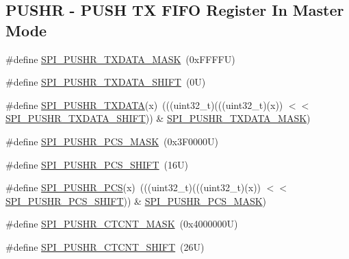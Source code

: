 \subsection*{P\+U\+S\+HR -\/ P\+U\+SH TX F\+I\+FO Register In Master Mode}
\begin{DoxyCompactItemize}
\item 
\#define \mbox{\hyperlink{group___s_p_i___register___masks_gac3651a6adad71c41138f88336e7711b4}{S\+P\+I\+\_\+\+P\+U\+S\+H\+R\+\_\+\+T\+X\+D\+A\+T\+A\+\_\+\+M\+A\+SK}}~(0x\+F\+F\+F\+F\+U)
\item 
\#define \mbox{\hyperlink{group___s_p_i___register___masks_gac9778e35b8039b1268b42e16066a7812}{S\+P\+I\+\_\+\+P\+U\+S\+H\+R\+\_\+\+T\+X\+D\+A\+T\+A\+\_\+\+S\+H\+I\+FT}}~(0\+U)
\item 
\#define \mbox{\hyperlink{group___s_p_i___register___masks_gad19c7faf45531d7c7a6703a54ac2f69d}{S\+P\+I\+\_\+\+P\+U\+S\+H\+R\+\_\+\+T\+X\+D\+A\+TA}}(x)~(((uint32\+\_\+t)(((uint32\+\_\+t)(x)) $<$$<$ \mbox{\hyperlink{group___s_p_i___register___masks_gac9778e35b8039b1268b42e16066a7812}{S\+P\+I\+\_\+\+P\+U\+S\+H\+R\+\_\+\+T\+X\+D\+A\+T\+A\+\_\+\+S\+H\+I\+FT}})) \& \mbox{\hyperlink{group___s_p_i___register___masks_gac3651a6adad71c41138f88336e7711b4}{S\+P\+I\+\_\+\+P\+U\+S\+H\+R\+\_\+\+T\+X\+D\+A\+T\+A\+\_\+\+M\+A\+SK}})
\item 
\#define \mbox{\hyperlink{group___s_p_i___register___masks_gae2a7d0ea8a143281112074fe3745a70c}{S\+P\+I\+\_\+\+P\+U\+S\+H\+R\+\_\+\+P\+C\+S\+\_\+\+M\+A\+SK}}~(0x3\+F0000\+U)
\item 
\#define \mbox{\hyperlink{group___s_p_i___register___masks_gafb0dfe436cd6273ce0b0052aca58499e}{S\+P\+I\+\_\+\+P\+U\+S\+H\+R\+\_\+\+P\+C\+S\+\_\+\+S\+H\+I\+FT}}~(16\+U)
\item 
\#define \mbox{\hyperlink{group___s_p_i___register___masks_gad551a287ffb207f5d78c2ac04d393a9b}{S\+P\+I\+\_\+\+P\+U\+S\+H\+R\+\_\+\+P\+CS}}(x)~(((uint32\+\_\+t)(((uint32\+\_\+t)(x)) $<$$<$ \mbox{\hyperlink{group___s_p_i___register___masks_gafb0dfe436cd6273ce0b0052aca58499e}{S\+P\+I\+\_\+\+P\+U\+S\+H\+R\+\_\+\+P\+C\+S\+\_\+\+S\+H\+I\+FT}})) \& \mbox{\hyperlink{group___s_p_i___register___masks_gae2a7d0ea8a143281112074fe3745a70c}{S\+P\+I\+\_\+\+P\+U\+S\+H\+R\+\_\+\+P\+C\+S\+\_\+\+M\+A\+SK}})
\item 
\#define \mbox{\hyperlink{group___s_p_i___register___masks_gad9e8859d590a59f5e208f5f4a2c8b873}{S\+P\+I\+\_\+\+P\+U\+S\+H\+R\+\_\+\+C\+T\+C\+N\+T\+\_\+\+M\+A\+SK}}~(0x4000000\+U)
\item 
\#define \mbox{\hyperlink{group___s_p_i___register___masks_ga7db8f0d7ae83f27f34eafd5e4d993ed1}{S\+P\+I\+\_\+\+P\+U\+S\+H\+R\+\_\+\+C\+T\+C\+N\+T\+\_\+\+S\+H\+I\+FT}}~(26\+U)

\end{DoxyCompactItemize}
